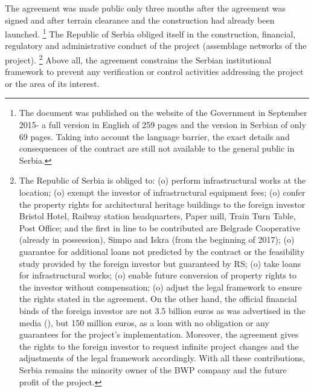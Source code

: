 \documentclass[11pt]{report}
\begin{document}
The  agreement  was  made  public  only  three  months  after  the  agreement  was  signed  and after terrain  clearance  and  the  construction  had  already been  launched.
\footnote{The document  was published on the website of the Government in September 2015- a full version in English of 259 pages and the version in Serbian of only 69 pages. Taking into account the language barrier, the exact details and consequences of the contract are still not available to the general public in Serbia.}
The Republic of Serbia obliged itself in the construction, financial, regulatory and administrative conduct of the project (assemblage networks of the project).
\footnote{The Republic of Serbia is obliged to: (o) perform infrastructural works at the location; (o) exempt the investor of infrastructural equipment fees; (o) confer the property rights for architectural heritage buildings to the foreign investor Bristol Hotel, Railway station headquarters, Paper mill, Train Turn Table, Post Office; and the first in line to be contributed are Belgrade Cooperative (already in possession), Simpo and Iskra (from the beginning of 2017); (o) guarantee for additional loans not predicted by the contract or the feasibility study provided by the foreign investor but guaranteed by RS; (o) take loans for infrastructural works; (o) enable future conversion of property rights to the investor without compensation; (o) adjust the legal framework to ensure the rights stated in the agreement. On the other hand, the official financial binds of the foreign investor are not 3.5 billion euros as was advertised in the media  (\href{Politika}{\citealt{politika_zemljiste_2015}}), but 150 million euros, as a loan with no obligation or any guarantees for the project’s implementation. Moreover, the agreement gives the rights to the foreign investor to request infinite project changes and the adjustments of the legal framework accordingly. With all these contributions, Serbia remains
the minority owner of the BWP company and the future profit of the project.}
Above all, the agreement constrains the Serbian institutional framework to prevent any verification or control activities addressing the project or the area of its interest.
\\
\end{document}

